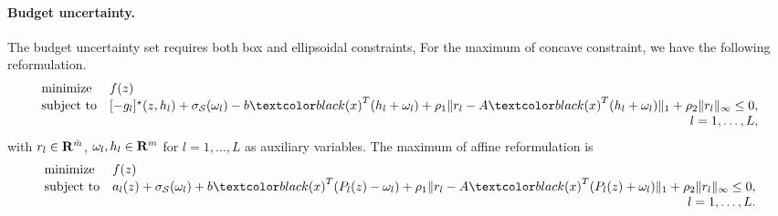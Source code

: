 \paragraph{Budget uncertainty.}
The budget uncertainty set requires both box and ellipsoidal constraints,
For the maximum of concave constraint, we have the following reformulation.
\begin{equation*}
	\begin{array}{ll}
		{\text{minimize}} & f(z) \\
		\mbox{subject to} & [-g_l]^\star(z,h_l)  + \sigma_\supp(\omega_l) -  b\RC{(x)}^T(h_l + \omega_l) + \rho_1\|r_l - A\RC{(x)}^T(h_l + \omega_l)\|_1  + \rho_2\|r_l\|_\infty \leq 0,\\
		&\hfill \quad l =  1, \dots,L,	\end{array}
	\end{equation*}
with $r_l \in {\mathbf R}^{\hat{m}}$, $\omega_l, h_l \in {\mathbf R}^m$ for $l = 1,\dots,L$ as auxiliary variables. The maximum of affine reformulation is 
\begin{equation}
	\label{eq:budget_max}
	\begin{array}{ll}
		\mbox{minimize} & f(z)\\
		\mbox{subject to} &  a_l(z) + \sigma_\supp(\omega_l) + b\RC{(x)}^T(P_l(z) - \omega_l) + \rho_1\|r_l - A\RC{(x)}^T(P_l(z) +\omega_l)\|_1 + \rho_2\|r_l\|_\infty \leq 0,\\
		&\hfill \quad l = 1,\dots,L.
	\end{array}
\end{equation}

